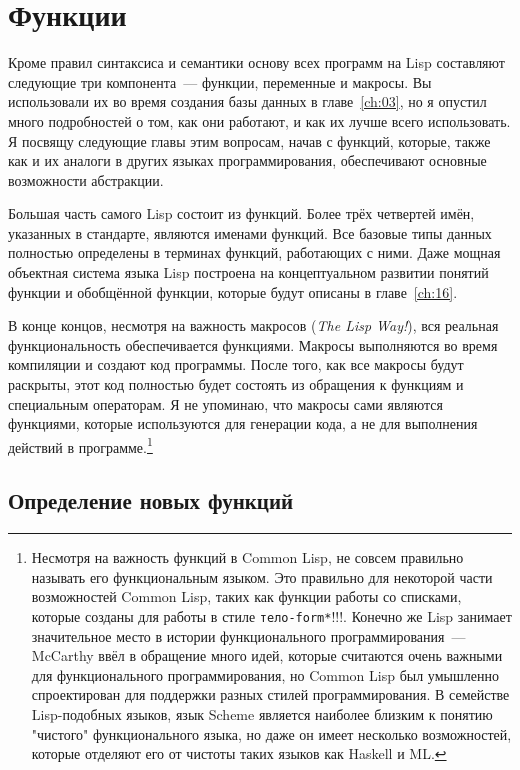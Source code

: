 \chapter{Функции}
\label{ch:05}

Кроме правил синтаксиса и семантики основу всех программ на Lisp составляют следующие три
компонента~--- функции, переменные и макросы.  Вы использовали их во время создания базы
данных в главе~\ref{ch:03}, но я опустил много подробностей о том, как они работают, и как
их лучше всего использовать.  Я посвящу следующие главы этим вопросам, начав с функций,
которые, также как и их аналоги в других языках программирования, обеспечивают основные
возможности абстракции.

Большая часть самого Lisp состоит из функций.  Более трёх четвертей имён, указанных в
стандарте, являются именами функций.  Все базовые типы данных полностью определены в
терминах функций, работающих с ними. Даже мощная объектная система языка Lisp построена на
концептуальном развитии понятий функции и обобщённой функции, которые будут описаны в
главе~\ref{ch:16}.

В конце концов, несмотря на важность макросов (\textit{The Lisp Way!}), вся реальная
функциональность обеспечивается функциями.  Макросы выполняются во время компиляции и
создают код программы. После того, как все макросы будут раскрыты, этот код полностью
будет состоять из обращения к функциям и специальным операторам.  Я не упоминаю, что
макросы сами являются функциями, которые используются для генерации кода, а не для
выполнения действий в программе.\footnote{Несмотря на важность функций в Common Lisp, не
  совсем правильно называть его функциональным языком.  Это правильно для некоторой части
  возможностей Common Lisp, таких как функции работы со списками, которые созданы для
  работы в стиле \lstinline{тело-form*}!!!. Конечно же Lisp занимает значительное место в
  истории функционального программирования~--- McCarthy ввёл в обращение много идей,
  которые считаются очень важными для функционального программирования, но Common Lisp был
  умышленно спроектирован для поддержки разных стилей программирования.  В семействе
  Lisp-подобных языков, язык Scheme является наиболее близким к понятию "чистого"
  функционального языка, но даже он имеет несколько возможностей, которые отделяют его от
  чистоты таких языков как Haskell и ML.}

\section{Определение новых функций}

